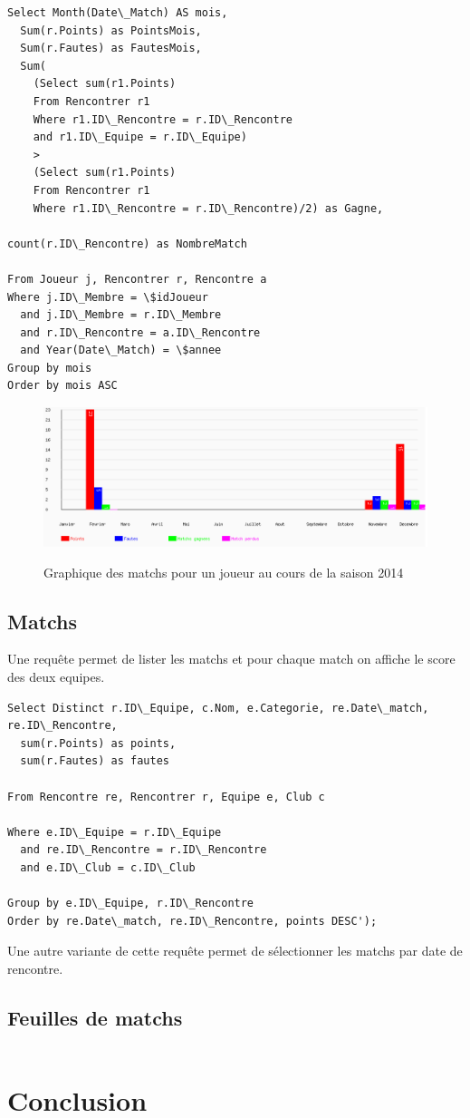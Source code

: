 \documentclass[a4paper»,8pt,french,fleqn]{report}
\begin{document}
\begin{lstlisting}
Select Month(Date\_Match) AS mois,
  Sum(r.Points) as PointsMois,
  Sum(r.Fautes) as FautesMois,
  Sum(
    (Select sum(r1.Points)
    From Rencontrer r1
    Where r1.ID\_Rencontre = r.ID\_Rencontre
    and r1.ID\_Equipe = r.ID\_Equipe)
    >
    (Select sum(r1.Points)
    From Rencontrer r1
    Where r1.ID\_Rencontre = r.ID\_Rencontre)/2) as Gagne,
    
count(r.ID\_Rencontre) as NombreMatch

From Joueur j, Rencontrer r, Rencontre a
Where j.ID\_Membre = \$idJoueur
  and j.ID\_Membre = r.ID\_Membre
  and r.ID\_Rencontre = a.ID\_Rencontre
  and Year(Date\_Match) = \$annee
Group by mois 
Order by mois ASC
\end{lstlisting}

\begin{figure}[h]
  \centering
    \includegraphics[scale=0.5]{graphe.png}
    \label{fig:graph}
    \caption{Graphique des matchs pour un joueur au cours de la saison 2014}
\end{figure}


\section{Matchs}
Une requête permet de lister les matchs et pour chaque match on affiche le score des deux equipes.

\begin{lstlisting}
Select Distinct r.ID\_Equipe, c.Nom, e.Categorie, re.Date\_match, re.ID\_Rencontre,
  sum(r.Points) as points, 
  sum(r.Fautes) as fautes 

From Rencontre re, Rencontrer r, Equipe e, Club c

Where e.ID\_Equipe = r.ID\_Equipe
  and re.ID\_Rencontre = r.ID\_Rencontre
  and e.ID\_Club = c.ID\_Club

Group by e.ID\_Equipe, r.ID\_Rencontre
Order by re.Date\_match, re.ID\_Rencontre, points DESC');
\end{lstlisting}

Une autre variante de cette requête permet de sélectionner les matchs par date de rencontre.


\section{Feuilles de matchs}

\begin{lstlisting}

\end{lstlisting}

\chapter*{Conclusion}
\end{document}
